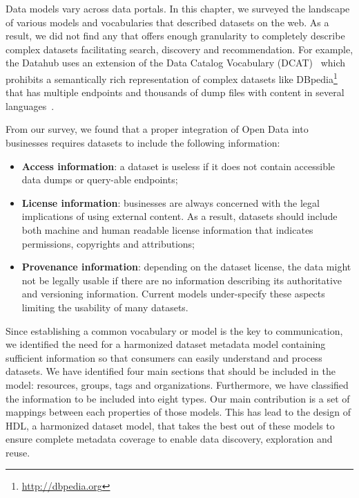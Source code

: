 Data models vary across data portals. In this chapter, we surveyed the landscape of various models and vocabularies that described datasets on the web. As a result, we did not find any that offers enough granularity to completely describe complex datasets facilitating search, discovery and recommendation. For example, the Datahub uses an extension of the Data Catalog Vocabulary (DCAT)~\cite{Erickson:DCV:14} which prohibits a semantically rich representation of complex datasets like DBpedia\footnote{\url{http://dbpedia.org}} that has multiple endpoints and thousands of dump files with content in several languages~\cite{Brummer::ICSS:14}.

From our survey, we found that a proper integration of Open Data into businesses requires datasets to include the following information:
\begin{itemize}
	\item \textbf{Access information}: a dataset is useless if it does not contain accessible data dumps or query-able endpoints;
	\item \textbf{License information}: businesses are always concerned with the legal implications of using external content. As a result, datasets should include both machine and human readable license information that indicates permissions, copyrights and attributions;
	\item \textbf{Provenance information}: depending on the dataset license, the data might not be legally usable if there are no information describing its authoritative and versioning information. Current models under-specify these aspects limiting the usability of many datasets.
\end{itemize}

Since establishing a common vocabulary or model is the key to communication, we identified the need for a harmonized dataset metadata model containing sufficient information so that consumers can easily understand and process datasets. We have identified four main sections that should be included in the model: resources, groups, tags and organizations. Furthermore, we have classified the information to be included into eight types. Our main contribution is a set of mappings between each properties of those models. This has lead to the design of HDL, a harmonized dataset model, that takes the best out of these models to ensure complete metadata coverage to enable data discovery, exploration and reuse.